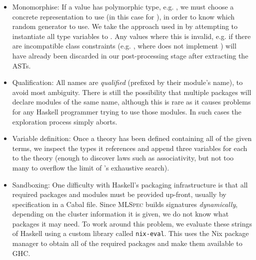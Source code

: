 \begin{itemize}
  \item{Monomorphise}: If a value has polymorphic type, e.g. , we must choose a concrete representation to use (in this case for ), in order to know which random generator to use. We take the approach used in \qcheck{} by attempting to instantiate all type variables to . Any values where this is invalid, e.g. if there are incompatible class constraints (e.g. , where  does not implement ) will have already been discarded in our post-processing stage after extracting the ASTs.

  \item{Qualification}: All names are \emph{qualified} (prefixed by their module's name), to avoid most ambiguity. There is still the possibility that multiple packages will declare modules of the same name, although this is rare as it causes problems for any Haskell programmer trying to use those modules. In such cases the exploration process simply aborts.

  \item{Variable definition}: Once a \qspec{} theory has been defined containing all of the given terms, we inspect the types it references and append three variables for each to the theory (enough to discover laws such as associativity, but not too many to overflow the limit of \qspec{}'s exhaustive search).

  \item{Sandboxing}: One difficulty with Haskell's packaging infrastructure is that all required packages and modules must be provided up-front, usually by specification in a Cabal file. Since \textsc{MLSpec} builds signatures \emph{dynamically}, depending on the cluster information it is given, we do not know what packages it may need. To work around this problem, we evaluate these strings of Haskell using a custom library called \texttt{nix-eval}. This uses the Nix package manager to obtain all of the required packages and make them available to GHC.

\end{itemize}
